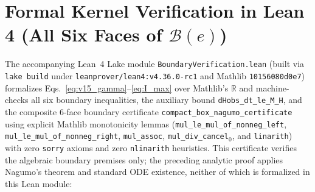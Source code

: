 \documentclass[11pt,a4paper]{article}
\theoremstyle{remark}
\begin{document}
\section{Formal Kernel Verification in Lean 4 (All Six Faces of $\mathcal{B}(e)$)}

The accompanying Lean~4 Lake module \texttt{Boundary\allowbreak Verification.lean} (built via \texttt{lake build} under \texttt{leanprover/\allowbreak lean4:\allowbreak v4.36.0-rc1} and Mathlib \texttt{10156080d0e7}) formalizes Eqs.~\eqref{eq:v15_gamma}--\eqref{eq:I_max} over Mathlib's $\mathbb{R}$ and machine-checks all six boundary inequalities, the auxiliary bound \texttt{dHobs\_\allowbreak dt\_\allowbreak le\_\allowbreak M\_H}, and the composite 6-face boundary certificate \texttt{compact\_\allowbreak box\_\allowbreak nagumo\_\allowbreak certificate} using explicit Mathlib monotonicity lemmas (\texttt{mul\_\allowbreak le\_\allowbreak mul\_\allowbreak of\_\allowbreak nonneg\_\allowbreak left}, \texttt{mul\_\allowbreak le\_\allowbreak mul\_\allowbreak of\_\allowbreak nonneg\_\allowbreak right}, \texttt{mul\_\allowbreak assoc}, \texttt{mul\_\allowbreak div\_\allowbreak cancel$_0$}, and \texttt{linarith}) with zero \texttt{sorry} axioms and zero \texttt{nlinarith} heuristics. This certificate verifies the algebraic boundary premises only; the preceding analytic proof applies Nagumo's theorem and standard ODE existence, neither of which is formalized in this Lean module:
\end{document}
